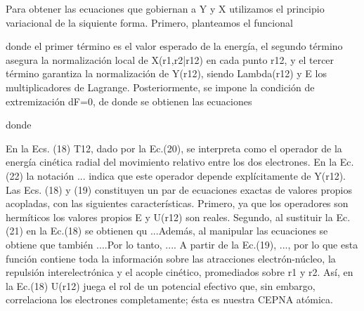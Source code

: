 \documentclass{article}
\begin{document}
Para obtener las ecuaciones que gobiernan a Y y X utilizamos el principio
variacional de la siquiente forma. Primero, planteamos el funcional


donde el primer término es el valor esperado de la energía, el segundo 
término asegura la normalización local de X(r1,r2|r12) en cada punto r12, y el tercer
término garantiza la normalización de Y(r12), siendo Lambda(r12) y E los
multiplicadores de Lagrange. Posteriormente, se impone la condición de extremización
dF=0, de donde se obtienen las ecuaciones


donde


En la Ecs. (18) T12, dado por la Ec.(20), se interpreta como el operador de la energía cinética
radial del movimiento relativo entre los dos electrones. En la Ec.(22) la notación ...
indica que este operador depende explícitamente de Y(r12).
Las Ecs. (18) y (19) constituyen un par de ecuaciones exactas de valores propios acopladas,
con las siguientes características. Primero, ya que los operadores son hermíticos
los valores propios E y U(r12) son reales. Segundo, al sustituir la Ec.(21) en la Ec.(18)
se obtienen qu ...Además, al manipular las ecuaciones se obtiene que también ....Por lo tanto,
.... A partir de la Ec.(19), ..., por lo que esta función contiene toda la información sobre
las atracciones electrón-núcleo, la repulsión interelectrónica y el acople cinético,
promediados sobre r1 y r2. Así, en la Ec.(18) U(r12) juega el rol de un potencial efectivo
que, sin embargo, correlaciona los electrones completamente; ésta es nuestra CEPNA atómica. 
\end{document}

